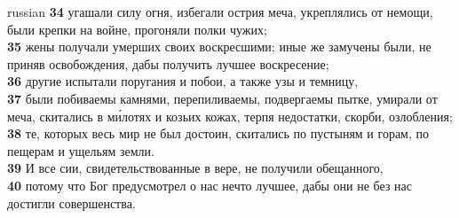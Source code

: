 \documentclass[10pt]{article} %
\begin{document}
{\begin{minipage}[t]{0.45\textwidth}
\begin{otherlanguage*}{russian}
\textbf{\scriptsize 34} угашали силу огня, избегали острия меча, укреплялись от немощи, были крепки на войне, прогоняли полки чужих;\\
\textbf{\scriptsize 35} жены получали умерших своих воскресшими; иные же замучены были, не приняв освобождения, дабы получить лучшее воскресение;\\
\textbf{\scriptsize 36} другие испытали поругания и побои, а также узы и темницу,\\
\textbf{\scriptsize 37} были побиваемы камнями, перепиливаемы, подвергаемы пытке, умирали от меча, скитались в ми́лотях и козьих кожах, терпя недостатки, скорби, озлобления;\\
\textbf{\scriptsize 38} те, которых весь мир не был достоин, скитались по пустыням и горам, по пещерам и ущельям земли.\\
\textbf{\scriptsize 39} И все сии, свидетельствованные в вере, не получили обещанного,\\
\textbf{\scriptsize 40} потому что Бог предусмотрел о нас нечто лучшее, дабы они не без нас достигли совершенства. \\
\end{otherlanguage*}
\end{minipage}
\hfill
\begin{minipage}[t]{0.45\textwidth}


\end{minipage}}
\end{document}
